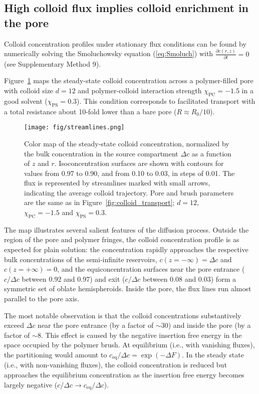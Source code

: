 \documentclass[12pt, a4paper]{article}
\begin{document}
\subsection{High colloid flux implies colloid enrichment in the pore}

Colloid concentration profiles under stationary flux conditions can be found by numerically solving the Smoluchowsky equation (\ref{eq:Smoluch}) with $\frac{\partial c(r,z)}{\partial t} = 0$  (see Supplementary Method 9). 

Figure~\ref{fig:colloid_concentration} maps the steady-state colloid concentration across a polymer-filled pore with colloid size $d = 12$ and polymer-colloid interaction strength $\chi_{\text{PC}} = -1.5$ in a good solvent ($\chi_{\text{PS}} = 0.3$).
This condition corresponds to facilitated transport with a total resistance about 10-fold lower than a bare pore ($R \approx R_0/10$).

\begin{figure}
    \centering
    \texttt{[image: fig/streamlines.png]}
    \caption{
    Color map of the steady-state colloid concentration, normalized by the bulk concentration in the source compartment $\Delta c$ as a function of $z$ and $r$.
    Isoconcentration surfaces are shown with contours for values from 0.97 to 0.90, and from 0.10 to 0.03, in steps of 0.01.
    The flux is represented by streamlines marked with small arrows, indicating the average colloid trajectory.
    Pore and brush parameters are the same as in Figure~\ref{fig:colloid_transport}; $d = 12$, $\chi_{\text{PC}} = -1.5$ and $\chi_{\text{PS}} = 0.3$.
    }
    \label{fig:colloid_concentration}
\end{figure}

The map illustrates several salient features of the diffusion process.
Outside the region of the pore and polymer fringes, the colloid concentration profile is as expected for plain solution: the concentration rapidly approaches the respective bulk concentrations of the semi-infinite reservoirs, $c(z = -\infty) = \Delta c$ and $c(z = +\infty) = 0$, and the equiconcentration surfaces near the pore entrance ($c/\Delta c$ between 0.92 and 0.97) and exit ($c/\Delta c$ between 0.08 and 0.03) form a symmetric set of oblate hemispheroids.
Inside the pore, the flux lines run almost parallel to the pore axis.

The most notable observation is that the colloid concentrations substantively exceed $\Delta c$ near the pore entrance (by a factor of $\sim30$) and inside the pore (by a factor  of $\sim8$.
This effect is caused by the negative insertion free energy in the space occupied by the polymer brush.
At equilibrium (i.e., with vanishing fluxes), the partitioning would amount to $c_{\text{eq}}/\Delta c = \exp\left( -\Delta F \right)$.
In the steady state (i.e., with non-vanishing fluxes), the colloid concentration is reduced but approaches the equilibrium concentration as the insertion free energy becomes largely negative ($c/\Delta c \to c_{\text{eq}}/\Delta c$).
\end{document}
